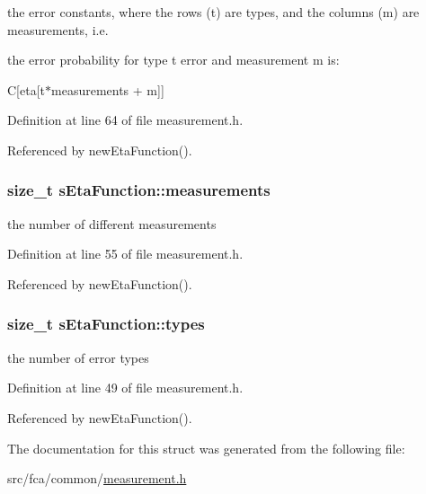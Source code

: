 the error constants, where the rows (t) are types, and the columns (m) are measurements, i.\-e. 

the error probability for type t error and measurement m is\-:

\-C\mbox{[}eta\mbox{[}t$\ast$measurements + m\mbox{]}\mbox{]} 

\-Definition at line 64 of file measurement.\-h.



\-Referenced by new\-Eta\-Function().

\hypertarget{structsEtaFunction_aa323ef11935cd1e8d6ef56405ab96cf8}{
\subsubsection[{measurements}]{\setlength{\rightskip}{0pt plus 5cm}size\-\_\-t {\bf s\-Eta\-Function\-::measurements}}}\label{structsEtaFunction_aa323ef11935cd1e8d6ef56405ab96cf8}


the number of different measurements 



\-Definition at line 55 of file measurement.\-h.



\-Referenced by new\-Eta\-Function().

\hypertarget{structsEtaFunction_afd94a9856047e0987c5e8667a4838b71}{
\subsubsection[{types}]{\setlength{\rightskip}{0pt plus 5cm}size\-\_\-t {\bf s\-Eta\-Function\-::types}}}\label{structsEtaFunction_afd94a9856047e0987c5e8667a4838b71}


the number of error types 



\-Definition at line 49 of file measurement.\-h.



\-Referenced by new\-Eta\-Function().



\-The documentation for this struct was generated from the following file\-:\begin{DoxyCompactItemize}
\item 
src/fca/common/\hyperlink{measurement_8h}{measurement.\-h}\end{DoxyCompactItemize}

